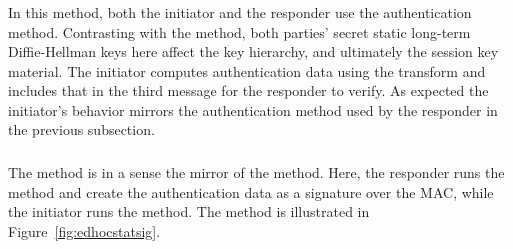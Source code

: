 \subsubsection{\mStatStat}
In this method, both the initiator and the responder use the \mStat{}
authentication method.
%
Contrasting with the \mSigStat{} method, both parties' secret static long-term
Diffie-Hellman keys here affect the key hierarchy, and ultimately the session
key material.
%
The initiator computes authentication data using the \mAead{} transform
and includes that in the third message for the responder to verify.
%
As expected the initiator's behavior mirrors the \mStat{} authentication method
used by the responder in the previous subsection.
%

\subsubsection{\mStatSig}
The \mStatSig{} method is in a sense the mirror of the \mSigStat{} method.
%
Here, the responder runs the \mSig{} method and create the \mAuthr{}
authentication data as a signature over the MAC, while the initiator runs the
\mStat{} method.
%
The method is illustrated in Figure~\ref{fig:edhocstatsig}.
%

